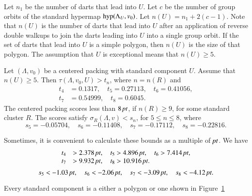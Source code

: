Let $n_1$ be the number of darts that lead into $U$.  Let $c$ be
the number of group orbits of the standard hypermap ${\operatorname{hyp}}(\Lambda_U,v_0)$.
Let $n(U) = n_1 + 2 (c-1)$.   Note that $n(U)$ is the number of darts
that lead into $U$ after an application of reverse double
walkups to join the darts leading into $U$ into a single group orbit.
If the set of darts that lead into $U$ is a simple polygon, then
$n(U)$ is the size of that polygon.  The assumption that $U$ is
exceptional means that $n(U)\ge 5$.

\begin{theorem}
    \label{thm:the-main-theorem}
    Let $(\Lambda,v_0)$ be a centered packing  with
standard component $U$.  Assume that $n(U)\ge 5$.
Then
$\tau(\Lambda,v_0,U) > t_n$, where $n=n(R)$ and
    $$
    \begin{array}{lll}
    t_4&=0.1317,\quad t_5=0.27113,\quad
    t_6=0.41056,\\
    t_7&=0.54999,\quad t_8=0.6045.
    \end{array}
    $$
The centered packing scores less than $8\,\hbox{\it pt}$, if $n(R)\ge 9$,
for some standard cluster $R$. The scores satisfy
$\sigma_R(\Lambda,v)<s_n$, for $5\le n\le 8$, where
    $$
    s_5=-0.05704,\quad s_6=-0.11408,\quad
    s_7=-0.17112,\quad s_8=-0.22816.
    $$
\end{theorem}

Sometimes, it is convenient to calculate these bounds as a multiple
of $\hbox{\it pt}$.  We have
    $$
    \begin{array}{lll}
    t_4&>2.378\,\hbox{\it pt},\quad t_5>4.896\,\hbox{\it pt},\quad
    t_6>7.414\,\hbox{\it pt},\\
    t_7&>9.932\,\hbox{\it pt},\quad
    t_8>10.916\,\hbox{\it pt}.
    \end{array}
    $$
    $$
    s_5 < -1.03\,\hbox{\it pt},\quad s_6<-2.06\,\hbox{\it pt},\quad
    s_7<-3.09\,\hbox{\it pt},\quad s_8<-4.12\,\hbox{\it pt}.
    $$




\begin{corollary}
    \label{cor:std-aggregate-list}
Every standard component is a either a polygon or one shown in
Figure~\ref{fig:std-aggregates}
\end{corollary}



\begin{figure}[htb]
  \centering
  \caption{}
  \label{fig:std-aggregates}
\end{figure}


